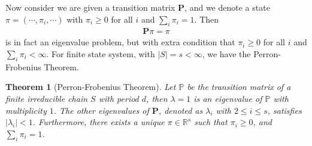 \documentclass[11pt, onesided]{book}
\theoremstyle{break}
\theoremstyle{break}
\newtheorem{thm}{Theorem}[section]
\newcommand{\R}{\mathbb{R}}
\begin{document}
Now consider we are given a transition matrix $\mathbf{P}$, and we denote a state $\pi = (\cdots, \pi_i , \cdots)$ with $\pi_i \geq 0$ for all $i$ and $\sum_{i}\pi_i = 1$. Then
\begin{align*}
\mathbf{P}\pi = \pi
\end{align*} 
is in fact an eigenvalue problem, but with extra condition that $\pi_i \geq 0$ for all $i$ and $\sum_i \pi_i < \infty$. For finite state system, with $|S| = s < \infty$, we have the Perron-Frobenius Theorem.
\begin{thm}[Perron-Frobenius Theorem]
Let $\mathbb{P}$ be the transition matrix of a finite irreducible chain $S$ with period $d$, then $\lambda = 1$ is an eigenvalue of $\mathbb{P}$ with multiplicity $1$. The other eigenvalues of $\mathbf{P}$, denoted as $\lambda_i$ with $2\leq i \leq s$, satisfies $|\lambda_i | < 1$. Furthermore, there exists a unique $\pi \in \R^s$ such that $\pi_i \geq 0$, and $\sum_i \pi_i = 1$. 
\end{thm}
\end{document}
